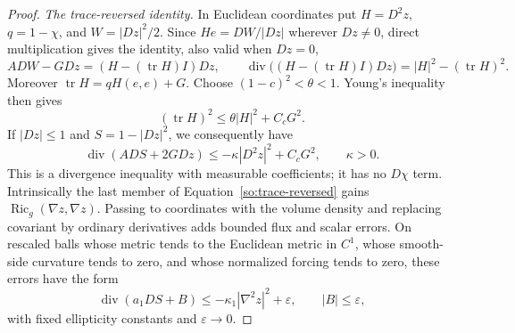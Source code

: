 \begin{proof}
\emph{The trace-reversed identity.}
In Euclidean coordinates put $H=D^2z$, $q=1-\chi$, and
$W=|Dz|^2/2$.  Since $He= D W/|Dz|$ wherever $Dz\ne0$, direct multiplication
gives the identity, also valid when $Dz=0$,
\begin{equation}\label{so:trace-reversed}
 A DW-GDz=(H-(\operatorname{tr}H)I)Dz,
 \qquad
 \operatorname{div}\bigl((H-(\operatorname{tr}H)I)Dz\bigr)
       =|H|^2-(\operatorname{tr}H)^2.
\end{equation}
Moreover $\operatorname{tr}H=qH(e,e)+G$.  Choose
$(1-c)^2<\theta<1$.  Young's inequality then gives
\[
 (\operatorname{tr}H)^2\le\theta |H|^2+C_cG^2.
\]
If $|Dz|\le1$ and $S=1-|Dz|^2$, we consequently have
\begin{equation}\label{so:deficit-inequality}
 \operatorname{div}(A DS+2GDz)
       \le-\kappa |D^2z|^2+C_cG^2,\qquad \kappa>0.
\end{equation}
This is a divergence inequality with measurable coefficients; it has no
$D\chi$ term.  Intrinsically the last member of
Equation~\ref{so:trace-reversed} gains
$\operatorname{Ric}_g(\nabla z,\nabla z)$.  Passing to coordinates with the
volume density and replacing covariant by ordinary derivatives adds
bounded flux and scalar errors.  On rescaled balls whose metric tends to
the Euclidean metric in $C^1$, whose smooth-side curvature tends to zero,
and whose normalized forcing tends to zero, these errors have the form
\begin{equation}\label{so:small-deficit}
 \operatorname{div}(a_1 DS+B)
 \le-\kappa_1|\nabla^2z|^2+\varepsilon,
 \qquad |B|\le\varepsilon,
\end{equation}
with fixed ellipticity constants and $\varepsilon\to0$.


\end{proof}
